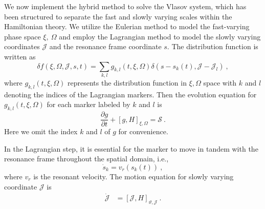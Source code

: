 We now implement the hybrid method to solve the Vlasov system, which has been structured to separate the fast and slowly varying scales within the Hamiltonian theory. We utilize the Eulerian method to model the fast-varying phase space $\xi,~\Omega$ and employ the Lagrangian method to model the slowly varying coordinates $\mathcal{J}$ and the resonance frame coordinate $s$.
The distribution function is written as \cite{shiroto2022}
\begin{equation}
    \delta f(\xi,\Omega,\mathcal{J},s,t) = \sum_{k,l} g_{k,l}(t,\xi,\Omega)\delta(s-s_k(t),\mathcal{J}-\mathcal{J}_l)~,
\end{equation}
where $g_{k,l}(t,\xi,\Omega)$ represents the distribution function in $\xi,\Omega$ space with $k$ and $l$ denoting the indices of the Lagrangian markers. 
Then the evolution equation for $g_{k,l}(t,\xi,\Omega)$ for each marker labeled by $k$ and $l$ is
\begin{equation}\label{eq.Euler}
\frac{\partial g}{\partial t} + \left[g,H\right]_{\xi,\Omega} = \mathcal{S}~.
\end{equation}
Here we omit the index $k$ and $l$ of $g$ for convenience.

In the Lagrangian step, it is essential for the marker to move in tandem with the resonance frame throughout the spatial domain, i.e.,
\begin{equation}\label{eq.resonance}
        \dot{s}_k = v_r(s_k(t))~,
\end{equation}
where $v_r$ is  the  resonant velocity.
The motion equation for slowly varying coordinate $\mathcal{J}$ is
\begin{equation}
    \begin{aligned}\label{eq.Lagrangian}
        \dot{\mathcal{J}} &= \left[\mathcal{J},H\right]_{\vartheta,\mathcal{J}}~.
    \end{aligned}
\end{equation}

